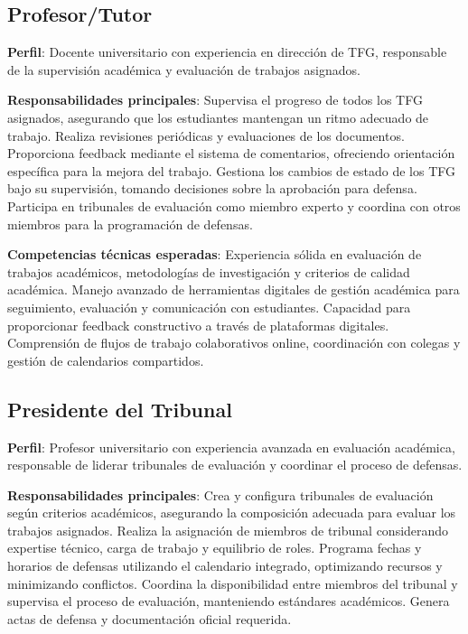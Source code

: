 \documentclass[12pt,a4paper,oneside]{report}
\begin{document}
\subsection{Profesor/Tutor}\label{profesortutor}

\textbf{Perfil}: Docente universitario con experiencia en dirección de
TFG, responsable de la supervisión académica y evaluación de trabajos
asignados.

\textbf{Responsabilidades principales}: Supervisa el progreso de todos los TFG asignados, asegurando que los estudiantes mantengan un ritmo adecuado de trabajo. Realiza revisiones periódicas y evaluaciones de los documentos. Proporciona feedback mediante el sistema de comentarios, ofreciendo orientación específica para la mejora del trabajo. Gestiona los cambios de estado de los TFG bajo su supervisión, tomando decisiones sobre la aprobación para defensa. Participa en tribunales de evaluación como miembro experto y coordina con otros miembros para la programación de defensas.

\textbf{Competencias técnicas esperadas}: Experiencia sólida en evaluación de trabajos académicos, metodologías de investigación y criterios de calidad académica. Manejo avanzado de herramientas digitales de gestión académica para seguimiento, evaluación y comunicación con estudiantes. Capacidad para proporcionar feedback constructivo a través de plataformas digitales. Comprensión de flujos de trabajo colaborativos online, coordinación con colegas y gestión de calendarios compartidos.

\subsection{Presidente del Tribunal}\label{presidente-del-tribunal}

\textbf{Perfil}: Profesor universitario con experiencia avanzada en
evaluación académica, responsable de liderar tribunales de evaluación y
coordinar el proceso de defensas.

\textbf{Responsabilidades principales}: Crea y configura tribunales de evaluación según criterios académicos, asegurando la composición adecuada para evaluar los trabajos asignados. Realiza la asignación de miembros de tribunal considerando expertise técnico, carga de trabajo y equilibrio de roles. Programa fechas y horarios de defensas utilizando el calendario integrado, optimizando recursos y minimizando conflictos. Coordina la disponibilidad entre miembros del tribunal y supervisa el proceso de evaluación, manteniendo estándares académicos. Genera actas de defensa y documentación oficial requerida.
\end{document}
